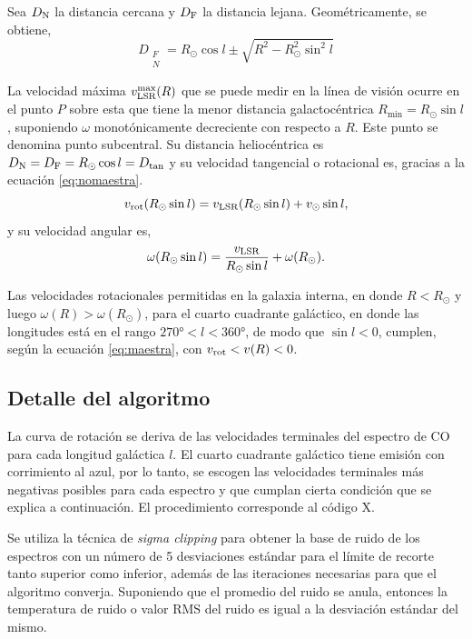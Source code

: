 Sea $D_\textnormal{N}$ la distancia cercana y $D_\textnormal{F}$ la distancia lejana. Geométricamente, se obtiene,
\begin{equation}
D_{\substack{F\\N}}=R_\odot\cos l\pm\sqrt{R^2-R_\odot^2\sin^2l}
\end{equation}

La velocidad máxima $v_\textnormal{LSR}^{\max}(R)$ que se puede medir en la línea de visión ocurre en el punto $P$ sobre esta que tiene la menor distancia galactocéntrica $R_{\min}=R_\odot\sin l$, suponiendo $\omega$ monotónicamente decreciente con respecto a $R$. Este punto se denomina punto subcentral. Su distancia heliocéntrica es $D_\textnormal{N}=D_\textnormal{F}=R_\odot\cos l=D_{\tan}$ y su velocidad tangencial o rotacional es, gracias a la ecuación \ref{eq:nomaestra}.
\begin{equation}
v_\textnormal{rot}(R_\odot\sin l)=v_\textnormal{LSR}(R_\odot\sin l)+v_\odot\sin l
,\label{eq:vrot}\end{equation}
y su velocidad angular es,
\begin{equation}
\omega(R_\odot\sin l)=\frac{v_\textnormal{LSR}}{R_\odot\sin l}+\omega(R_\odot)
.\label{eq:wrot}\end{equation}

Las velocidades rotacionales permitidas en la galaxia interna, en donde $R<R_\odot$ y luego $\omega(R)>\omega(R_\odot)$, para el cuarto cuadrante galáctico, en donde las longitudes está en el rango $\ang{270}<l<\ang{360}$, de modo que $\sin l<0$, cumplen, según la ecuación \ref{eq:maestra}, con $v_{\textnormal{rot}}<v(R)<0$.

\subsection{Detalle del algoritmo}

La curva de rotación se deriva de las velocidades terminales del espectro de CO para cada longitud galáctica $l$. El cuarto cuadrante galáctico tiene emisión con corrimiento al azul, por lo tanto, se escogen las velocidades terminales más negativas posibles para cada espectro y que cumplan cierta condición que se explica a continuación. El procedimiento corresponde al código X.

Se utiliza la técnica de \textit{sigma clipping} para obtener la base de ruido de los espectros con un número de 5 desviaciones estándar para el límite de recorte tanto superior como inferior, además de las iteraciones necesarias para que el algoritmo converja. Suponiendo que el promedio del ruido se anula, entonces la temperatura de ruido o valor RMS del ruido es igual a la desviación estándar del mismo.

